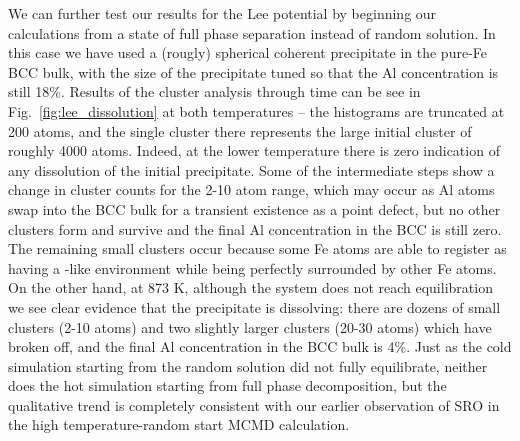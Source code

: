 We can further test our results for the Lee potential by beginning our calculations from a state of full phase separation instead of random solution.
In this case we have used a (rougly) spherical \DOTHREE coherent precipitate in the pure-Fe BCC bulk, with the size of the precipitate tuned so that the Al concentration is still 18\%.
Results of the cluster analysis through time can be see in Fig.~\ref{fig:lee_dissolution} at both temperatures -- the histograms are truncated at 200 atoms, and the single cluster there represents the large initial cluster of roughly 4000 atoms.
Indeed, at the lower temperature there is zero indication of any dissolution of the initial precipitate.
Some of the intermediate steps show a change in cluster counts for the 2-10 atom range, which may occur as Al atoms swap into the BCC bulk for a transient existence as a point defect, but no other clusters form and survive and the final Al concentration in the BCC is still zero.
The remaining small clusters occur because some Fe atoms are able to register as having a \DOTHREE-like environment while being perfectly surrounded by other Fe atoms.
On the other hand, at 873 K, although the system does not reach equilibration we see clear evidence that the precipitate is dissolving: there are dozens of small clusters (2-10 atoms) and two slightly larger clusters (20-30 atoms) which have broken off, and the final Al concentration in the BCC bulk is 4\%.
Just as the cold simulation starting from the random solution did not fully equilibrate, neither does the hot simulation starting from full phase decomposition, but the qualitative trend is completely consistent with our earlier observation of SRO in the high temperature-random start MCMD calculation.

